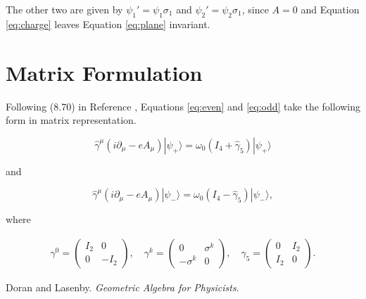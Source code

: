 \documentclass{article}
\begin{document}
  The other two are given by $\psi_1' = \psi_1 \sigma_1$ and $\psi_2' = \psi_2 \sigma_1$, since $A=0$ and Equation \ref{eq:charge} leaves Equation \ref{eq:plane} invariant.

  \appendix

  \section{Matrix Formulation} \label{matrix}

  Following (8.70) in Reference \cite{gap}, Equations \ref{eq:even} and \ref{eq:odd} take the following form in matrix representation.

  \begin{equation}
    \hat \gamma^\mu (i \partial_\mu - e A_\mu) | \psi_+ \rangle = \omega_0 (I_4 + \hat \gamma_5) | \psi_+ \rangle
  \end{equation}

  and

  \begin{equation}
    \hat \gamma^\mu (i \partial_\mu - e A_\mu) | \psi_- \rangle = \omega_0 (I_4 - \hat \gamma_5) | \psi_- \rangle,
  \end{equation}

  where

  \begin{align}
    \gamma^0 = \begin{pmatrix} I_2 & 0 \\ 0 & -I_2 \end{pmatrix},\quad \gamma^k = \begin{pmatrix} 0 & \sigma^k \\ -\sigma^k & 0 \end{pmatrix},\quad \gamma_5 = \begin{pmatrix} 0 & I_2 \\ I_2 & 0 \end{pmatrix}.
  \end{align}


  \begin{thebibliography}{9}
      Doran and Lasenby.
      \textit{Geometric Algebra for Physicists}.
  \end{thebibliography}
\end{document}
